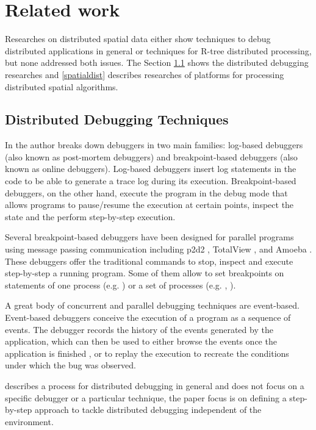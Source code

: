 \section{Related work}
\label{sec:related}

Researches on distributed spatial data either show techniques to debug distributed applications in general or techniques for R-tree distributed processing, 
but none addressed both issues.
The Section \ref{dist_debug} shows the distributed debugging researches and \ref{spatialdist} describes researches of platforms for processing distributed spatial algorithms.
	
\subsection{Distributed Debugging Techniques}
\label{dist_debug}

In \cite{remeD2011} the author breaks down debuggers in two main families: log-based debuggers (also known as post-mortem debuggers) and breakpoint-based debuggers 
(also known as online debuggers). 
Log-based debuggers insert log statements in the code to be able to generate a trace log during its execution. 
Breakpoint-based debuggers, on the other hand, execute the program in the debug mode that allows programs to pause/resume the execution at certain points, 
inspect the state and the perform step-by-step execution. 

Several breakpoint-based debuggers have been designed for parallel programs using message passing communication including p2d2 \cite{p2d21996}, TotalView \cite{totalView2009}, and Amoeba \cite{amoeba1989}. 
These debuggers offer the traditional commands to stop, inspect and execute step-by-step a running program. 
Some of them allow to set breakpoints on statements of one process (e.g. \cite{totalView2009}) or a set of processes (e.g. \cite{p2d21996}, \cite{amoeba1989}). 

A great body of concurrent and parallel debugging techniques are event-based. 
Event-based debuggers \cite{mcdowell1989Debugging} conceive the execution of a program as a sequence of events. 
The debugger records the history of the events generated by the application, which can then be used to either browse the events once the application is finished \cite{xtrace2007,causeway2009}, 
or to replay the execution to recreate the conditions under which the bug was observed. 
 
\cite{cheung1990Framework} describes a process for distributed debugging in general and does not focus on a specific debugger or a particular technique, 
the paper focus is on defining a step-by-step approach to tackle distributed debugging independent of the environment. 
	

